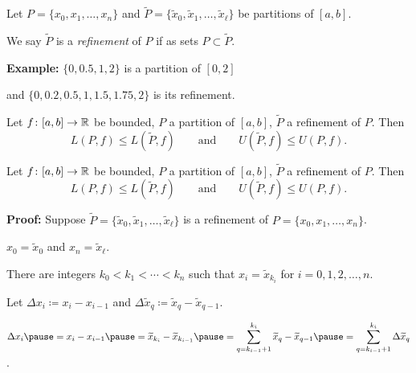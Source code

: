\documentclass[10pt,aspectratio=169]{beamer}
\begin{document}
\begin{frame}

\begin{definition}
Let $P = \{ x_0, x_1, \ldots, x_n \}$ and
$\widetilde{P} = \{ \widetilde{x}_0, \widetilde{x}_1, \ldots,
\widetilde{x}_{\ell} \}$ be
partitions of $[a,b]$.

\pause
We say $\widetilde{P}$ is a
\emph{refinement} of $P$
if as sets $P \subset \widetilde{P}$.
\end{definition}

\pause
\textbf{Example:}
$\{ 0, 0.5, 1, 2 \}$ is a partition of $[0,2]$

and
$\{ 0, 0.2, 0.5, 1, 1.5, 1.75, 2 \}$ is its refinement.

\pause
\medskip

\begin{proposition}
Let $f \colon [a,b] \to {\mathbb{R}}$ be bounded, $P$
a partition of $[a,b]$, $\widetilde{P}$ a refinement of $P$.
\pause
Then
\begin{equation*}
L(P,f) \leq L(\widetilde{P},f) 
\qquad \text{and} \qquad
U(\widetilde{P},f) \leq U(P,f) .
\end{equation*}
\end{proposition}

\end{frame}

\begin{frame}

\begin{proposition}
Let $f \colon [a,b] \to {\mathbb{R}}$ be bounded, $P$
a partition of $[a,b]$, $\widetilde{P}$ a refinement of $P$.
Then
\begin{equation*}
L(P,f) \leq L(\widetilde{P},f) 
\qquad \text{and} \qquad
U(\widetilde{P},f) \leq U(P,f) .
\end{equation*}
\end{proposition}

\pause
\textbf{Proof:}
Suppose $\widetilde{P} = \{ \widetilde{x}_0, \widetilde{x}_1, \ldots,
\widetilde{x}_{\ell} \}$ is
a refinement of 
$P = \{ x_0, x_1, \ldots, x_n \}$.

\pause
\thus \quad
$x_0 = \widetilde{x}_0$ and 
$x_n = \widetilde{x}_{\ell}$.

\pause
There are integers
$k_0 < k_1 < \cdots < k_n$ such that $x_i = \widetilde{x}_{k_i}$ for
$i=0,1,2,\ldots,n$.

\pause
Let
$\Delta x_i \coloneqq x_i - x_{i-1}$
and
$\Delta \widetilde{x}_q \coloneqq \widetilde{x}_q - \widetilde{x}_{q-1}$.

\pause
\medskip


\pause
\medskip

$\displaystyle
\Delta x_i
\pause
=
x_i - x_{i-1}
\pause
=
\widetilde{x}_{k_i} - \widetilde{x}_{k_{i-1}}
\pause
=
\sum_{q=k_{i-1}+1}^{k_i} 
\widetilde{x}_{q} - \widetilde{x}_{q-1}
\pause
=
\sum_{q=k_{i-1}+1}^{k_i} \Delta \widetilde{x}_q
$.

\end{frame}
\end{document}
